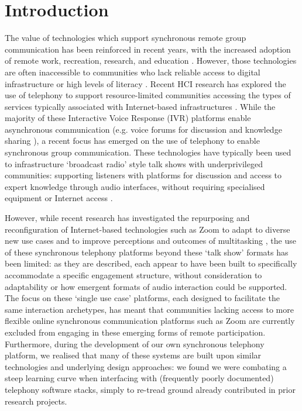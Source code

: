 \section{Introduction}

The value of technologies which support synchronous remote group communication has been reinforced in recent years, with the increased adoption of remote work, recreation, research, and education \cite{cumbo2021, scriven2021, takashi2012}. However, those technologies are often inaccessible to communities who lack reliable access to digital infrastructure or high levels of literacy \cite{kommiya2019}. Recent HCI research has explored the use of telephony to support resource-limited communities accessing the types of services typically associated with Internet-based infrastructures \cite{khullar2021, Csik2016, Richardson2022, eitzinger2019}. While the majority of these Interactive Voice Response (IVR) platforms enable asynchronous communication (e.g. voice forums for discussion and knowledge sharing \cite{Patel2010}), a recent focus has emerged on the use of telephony to enable synchronous group communication. These technologies have typically been used to infrastructure `broadcast radio' style talk shows with underprivileged communities: supporting listeners with platforms for discussion and access to expert knowledge through audio interfaces, without requiring specialised equipment or Internet access \cite{Kazakos2016, Yadav2017, Talhouk2017}. 

However, while recent research has investigated the repurposing and reconfiguration of Internet-based technologies such as Zoom to adapt to diverse new use cases \cite{Bartindale2021} and to improve perceptions and outcomes of multitasking \cite{marlow2016}, the use of these synchronous telephony platforms beyond these `talk show' formats has been limited: as they are described, each appear to have been built to specifically accommodate a specific engagement structure, without consideration to adaptability or how emergent formats of audio interaction could be supported. The focus on these `single use case' platforms, each designed to facilitate the same interaction archetypes, has meant that communities lacking access to more flexible online synchronous communication platforms such as Zoom are currently excluded from engaging in these emerging forms of remote participation. Furthermore, during the development of our own synchronous telephony platform, we realised that many of these systems are built upon similar technologies and underlying design approaches: we found we were combating a steep learning curve when interfacing with (frequently poorly documented) telephony software stacks, simply to re-tread ground already contributed in prior research projects.

